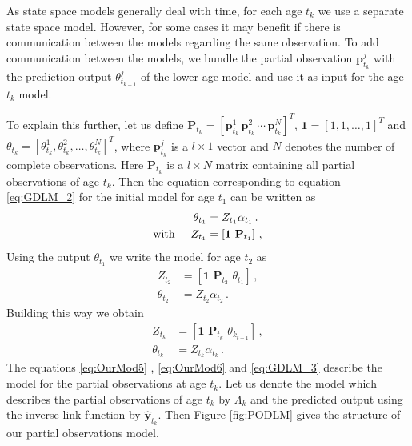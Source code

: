 \documentclass[11pt]{article}
\begin{document}
	As state space models generally deal with time, for each age $t_k$ we use a separate state space model. However, for some cases it may benefit if there is  communication between the models regarding the same observation.  To add communication between the models, we bundle the partial observation $\mathbf{p}^j_{t_k}$ with the prediction output  $\theta^j_{t_{k-1}}$ of the lower age model and use it as input for the age $t_k$ model. %
	

	
	To explain this further, let us define $\mathbf{P}_{t_k} = \left[ \mathbf{p}^1_{t_k}\,   \mathbf{p}^2_{t_k}\,  \cdots \, \mathbf{p}^N_{t_k}   \right]^T$,  $\mathbf{1} = \left[ 1, 1, \ldots, 1\right]^T$ and $\theta_{t_k} = \left[\theta^1_{t_k}, \theta^2_{t_k}, \ldots, \theta^N_{t_k}  \right]^T$,   where $\mathbf{p}^j_{t_k}$ is a $l \times 1 $ vector and $N$ denotes the number of complete observations. Here $\mathbf{P}_{t_k}$ is a $l \times N$ matrix containing all partial observations of age $t_k$.     Then the equation corresponding to equation \eqref{eq:GDLM_2} for the initial model for age $t_1$ can be written as 
	\begin{align}
	\theta_{t_1}  & = Z_{t_1}  \alpha_{t_1} \, .   \label{eq:OurMod2}  \\
	\text{with} \hspace{0.5cm} Z_{t_1} & =  \left[  \mathbf{1} \, \,   \mathbf{P}_{t_1} \right] \, , \label{eq:OurMod1}  
	\end{align}
	Using the output $\theta_{t_1}$ we write the model for age $t_2$ as 
	\begin{align}
	Z_{t_2} & =  \left[  \mathbf{1} \, \,   \mathbf{P}_{t_2} \, \,  \theta_{t_1}  \right]  \, ,\label{eq:OurMod3} \\
	\theta_{t_2}  & = Z_{t_2}  \alpha_{t_2} \, .   \label{eq:OurMod4} 
	\end{align}
	Building this way we obtain
	\begin{align}
	Z_{t_k} & =  \left[  \mathbf{1} \, \,   \mathbf{P}_{t_k} \, \,  \theta_{k_{t-1}}  \right]  \, , \label{eq:OurMod5} \\
	\theta_{t_k}  & = Z_{t_k}  \alpha_{t_k} \, .    \label{eq:OurMod6} 
	\end{align}
	The equations \eqref{eq:OurMod5} , \eqref{eq:OurMod6} and \eqref{eq:GDLM_3}  describe the model for the partial observations at age $t_k$. Let us denote the model which describes the partial observations of age $t_k$ by $\Lambda_k$ and the predicted output  using the inverse link function by $\hat{\mathbf{y}}_{t_k}$. Then Figure \ref{fig:PODLM} gives the structure of our partial observations model.  
	
\end{document}
